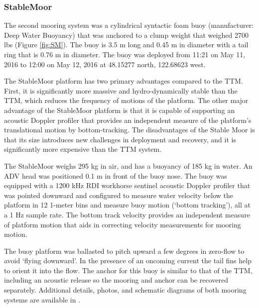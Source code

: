 \documentclass[twocol]{ametsoc}
\begin{document}
\subsubsection{StableMoor}

The second mooring system was a cylindrical syntactic foam buoy (manufacturer: Deep Water Buoyancy) that was anchored to a clump weight that weighed 2700 lbs (Figure \ref{fig:SM}). The buoy is 3.5 m long and 0.45 m in diameter with a tail ring that is 0.76 m in diameter. The buoy was deployed from 11:21 on May 11, 2016 to 12:00 on May 12, 2016 at 48.15277 north, 122.68623 west.

The StableMoor platform has two primary advantages compared to the TTM. First, it is significantly more massive and hydro-dynamically stable than the TTM, which reduces the frequency of motions of the platform. The other major advantage of the StableMoor platform is that it is capable of supporting an acoustic Doppler profiler that provides an independent measure of the platform's translational motion by bottom-tracking. The disadvantages of the Stable Moor is that its size introduces new challenges in deployment and recovery, and it is significantly more expensive than the TTM system.

The StableMoor weighs 295 kg in air, and has a buoyancy of 185 kg in water. An ADV head was positioned 0.1 m in front of the buoy nose.  The buoy was equipped with a 1200 kHz RDI workhorse sentinel acoustic Doppler profiler that was pointed downward and configured to measure water velocity below the platform in 12 1-meter bins and measure buoy motion (`bottom tracking'), all at a 1 Hz sample rate. The bottom track velocity provides an independent measure of platform motion that aids in correcting velocity measurements for mooring motion.

The buoy platform was ballasted to pitch upward a few degrees in zero-flow to avoid `flying downward'. In the presence of an oncoming current the tail fins help to orient it into the flow. The anchor for this buoy is similar to that of the TTM, including an acoustic release so the mooring and anchor can be recovered separately. Additional details, photos, and schematic diagrams of both mooring systems are available in \cite{Harding_MotionPaper}.
\end{document}
